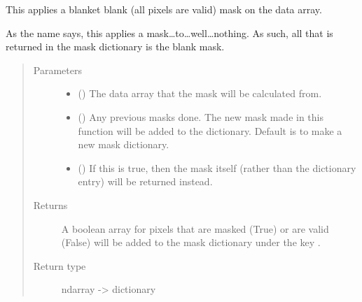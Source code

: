 \documentclass[letterpaper,10pt,english]{sphinxmanual}
\begin{document}
\begin{fulllineitems}
\label{\detokenize{python_docstrings/IfA_Smeargle.echo.masks.masks_echo300:IfA_Smeargle.echo.masks.masks_echo300.echo398_nothing}}
This applies a blanket blank (all pixels are valid) mask on the data array.

As the name says, this applies a mask…to…well…nothing. As such, all that is
returned in the mask dictionary is the blank mask.
\begin{quote}\begin{description}
\item[{Parameters}] \leavevmode\begin{itemize}
\item {} 
 () \textendash{} The data array that the mask will be calculated from.

\item {} 
 (\sphinxstyleliteralemphasis{\sphinxupquote{ (}}\sphinxstyleliteralemphasis{\sphinxupquote{)}}) \textendash{} Any previous masks done. The new mask made in this function will be added to the
dictionary. Default is to make a new mask dictionary.

\item {} 
 (\sphinxstyleliteralemphasis{\sphinxupquote{ (}}\sphinxstyleliteralemphasis{\sphinxupquote{)}}) \textendash{} If this is true, then the mask itself (rather than the dictionary entry) will be
returned instead.

\end{itemize}

\item[{Returns}] \leavevmode
{} \textendash{} A boolean array for pixels that are masked (True) or are valid (False) will be added to
the mask dictionary under the key .

\item[{Return type}] \leavevmode
ndarray -\textgreater{} dictionary

\end{description}\end{quote}

\end{fulllineitems}
\end{document}
